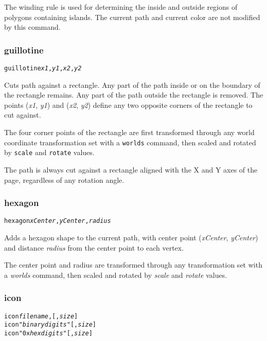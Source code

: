The winding rule is used for determining the inside and outside
regions of polygons containing islands.
The current path and current color are not modified by this command.

\subsubsection{guillotine}

\begin{alltt}
guillotine \textit{x1}, \textit{y1}, \textit{x2}, \textit{y2}
\end{alltt}

Cuts path against a rectangle.
Any part of the path inside or
on the boundary of the rectangle remains.
Any part of the path outside the rectangle is removed.
The points
(\textit{x1}, \textit{y1}) and (\textit{x2}, \textit{y2}) define
any two opposite corners of the rectangle to cut against.

The four corner points of the rectangle
are first transformed through any world coordinate
transformation set with a \texttt{worlds} command,
then scaled and rotated by \texttt{scale}
and \texttt{rotate} values.

The path is always cut against a rectangle
aligned with the X and Y axes of the page, regardless of any rotation angle.

\subsubsection{hexagon}

\begin{alltt}
hexagon \textit{xCenter}, \textit{yCenter}, \textit{radius}
\end{alltt}

Adds a hexagon shape to the current path, with center
point (\textit{xCenter}, \textit{yCenter}) and distance
\textit{radius}
from the center point to each vertex.

The center point and radius are transformed through any
transformation set with a \textit{worlds} command,
then scaled and rotated by \textit{scale}
and \textit{rotate} values.

\subsubsection{icon}

\begin{alltt}
icon \textit{filename}, [, \textit{size}]
icon "\textit{binarydigits}" [, \textit{size}]
icon "0x\textit{hexdigits}" [, \textit{size}]
\end{alltt}

